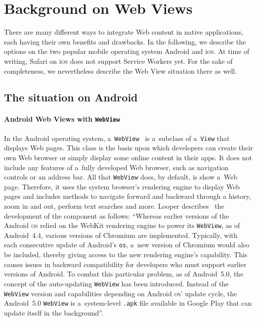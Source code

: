 \documentclass[sigconf]{acmart}
\begin{document}
\section{Background on Web Views}
\label{sec:background}

There are many different ways to integrate Web content in native applications,
each having their own benefits and drawbacks.
In the following, we describe the options on the two popular
mobile operating system Android and i\textsc{os}.
At time of writing, Safari on i\textsc{os} does not support Service Workers yet.
For the sake of completeness, we nevertheless describe the Web View situation there as well.

\subsection{The situation on Android}

\paragraph{Android Web Views with \texttt{WebView}}

In the Android operating system, a~\texttt{WebView}~\cite{android2018webview}
is a~subclass of a~\texttt{View} that displays Web pages.
This class is the basis upon which developers can create their own Web browser
or simply display some online content in their apps.
It does not include any features of a~fully developed Web browser,
such as navigation controls or an address bar.
All that \texttt{WebView} does, by default, is show a~Web page.
Therefore, it uses the system browser's rendering engine to display Web pages
and includes methods to navigate forward and backward through a history,
zoom in and out, perform text searches and more.
Looper describes~\cite{looper2015webviews}
the development of the component as follows:
``Whereas earlier versions of the Android \textsc{os}
relied on the WebKit rendering engine to power its \texttt{WebView},
as of Android~4.4, various versions of Chromium are implemented.
Typically, with each consecutive update of Android's \texttt{os},
a~new version of Chromium would also be included, thereby giving access
to the new rendering engine's capability.
This causes issues in backward compatibility for developers
who must support earlier versions of Android.
To combat this particular problem, as of Android~5.0,
the concept of the auto-updating \texttt{WebView} has been introduced.
Instead of the \texttt{WebView} version and capabilities
depending on Android \textsc{os}' update cycle,
the Android~5.0 \texttt{WebView} is a~system-level \texttt{.apk} file
available in Google Play that can update itself in the background''.
\end{document}
